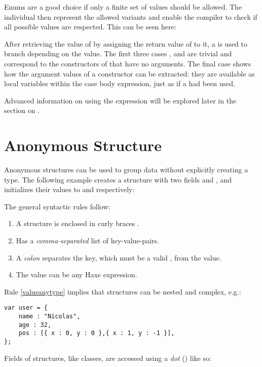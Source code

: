 Enums are a good choice if only a finite set of values should be allowed. The individual  then represent the allowed variants and enable the compiler to check if all possible values are respected. This can be seen here:


After retrieving the value of  by assigning the return value of  to it, a  is used to branch depending on the value. The first three cases ,  and  are trivial and correspond to the constructors of  that have no arguments. The final case  shows how the argument values of a constructor can be extracted: they are available as local variables within the case body expression, just as if a  had been used.

Advanced information on using the  expression will be explored later in the section on .


\section{Anonymous Structure}
\label{types-anonymous-structure}

Anonymous structures can be used to group data without explicitly creating a type. The following example creates a structure with two fields  and , and initializes their values to  and  respectively:

The general syntactic rules follow:

\begin{enumerate}
	\item A structure is enclosed in curly braces \expr{$\left\{\right\}$}. 
	\item Has a \emph{comma-separated} list of key-value-pairs.
	\item A \emph{colon} separates the key, which must be a valid , from the value.
	\item\label{valueanytype} The value can be any Haxe expression.
\end{enumerate}
Rule \ref{valueanytype} implies that structures can be nested and complex, e.g.:

\begin{lstlisting}
var user = {
    name : "Nicolas",
    age : 32,
    pos : [{ x : 0, y : 0 },{ x : 1, y : -1 }],
};
\end{lstlisting}
Fields of structures, like classes, are accessed using a \emph{dot} () like so:

